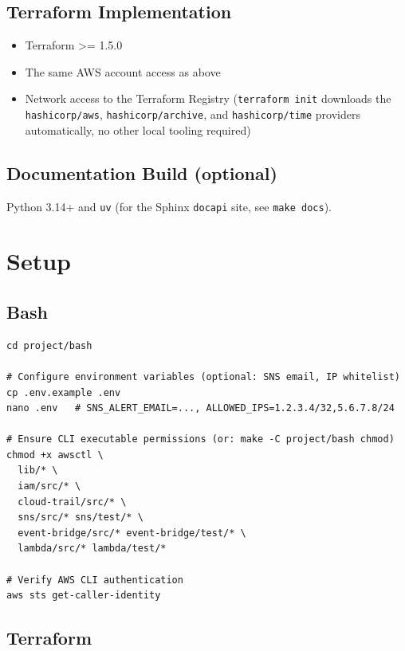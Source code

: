 \documentclass[11pt,a4paper]{report}
\begin{document}
\subsection{Terraform Implementation}

\begin{itemize}[leftmargin=1.4em]
  \item Terraform >= 1.5.0
  \item The same AWS account access as above
  \item Network access to the Terraform Registry (\texttt{terraform init} downloads the \texttt{hashicorp/aws}, \texttt{hashicorp/archive}, and \texttt{hashicorp/time} providers automatically, no other local tooling required)
\end{itemize}

\subsection{Documentation Build (optional)}

Python 3.14+ and \texttt{uv} (for the Sphinx \texttt{docapi} site, see
\texttt{make docs}).

\section{Setup}

\subsection{Bash}

\begin{lstlisting}
cd project/bash

# Configure environment variables (optional: SNS email, IP whitelist)
cp .env.example .env
nano .env   # SNS_ALERT_EMAIL=..., ALLOWED_IPS=1.2.3.4/32,5.6.7.8/24

# Ensure CLI executable permissions (or: make -C project/bash chmod)
chmod +x awsctl \
  lib/* \
  iam/src/* \
  cloud-trail/src/* \
  sns/src/* sns/test/* \
  event-bridge/src/* event-bridge/test/* \
  lambda/src/* lambda/test/*

# Verify AWS CLI authentication
aws sts get-caller-identity
\end{lstlisting}

\subsection{Terraform}
\end{document}
